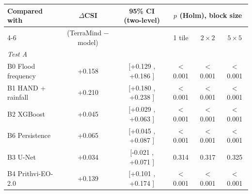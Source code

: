 \begin{tabular}{lccccc}
\toprule
Compared with & $\Delta$CSI & 95\% CI (two-level) & \multicolumn{3}{c}{$p$ (Holm), block size} \\
\cmidrule(lr){4-6}
 & (TerraMind $-$ model) & & 1 tile & $2\times2$ & $5\times5$ \\
\midrule
\multicolumn{6}{l}{\textit{Test A}} \\
B0 Flood frequency
& +0.158%
& [+0.129%
, +0.186%
]
& $<$0.001%
& $<$0.001%
& $<$0.001%
\\
B1 HAND + rainfall
& +0.210%
& [+0.180%
, +0.238%
]
& $<$0.001%
& $<$0.001%
& $<$0.001%
\\
B2 XGBoost
& +0.045%
& [+0.029%
, +0.063%
]
& $<$0.001%
& $<$0.001%
& $<$0.001%
\\
B6 Persistence
& +0.065%
& [+0.045%
, +0.087%
]
& $<$0.001%
& $<$0.001%
& $<$0.001%
\\
B3 U-Net
& +0.034%
& [-0.021%
, +0.071%
]
& 0.314%
& 0.317%
& 0.325%
\\
B4 Prithvi-EO-2.0
& +0.139%
& [+0.101%
, +0.174%
]
& $<$0.001%
& $<$0.001%
& $<$0.001%
\\

\end{tabular}
